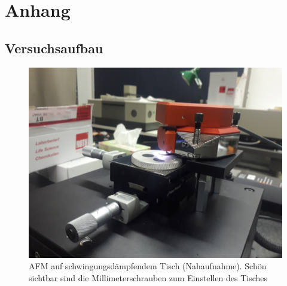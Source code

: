 

\chapter{Anhang}
\label{chap:anhangA}


\section{Versuchsaufbau}
\label{section:AnhangAufbau} 

\begin{figure}[h]
    \centering
    \includegraphics[width = \linewidth]{Bilder/Aufbau/20210920_093605.jpg}
    \caption{AFM auf schwingungsdämpfendem Tisch (Nahaufnahme). Schön sichtbar sind die Millimeterschrauben zum Einstellen des Tisches}
\end{figure}

